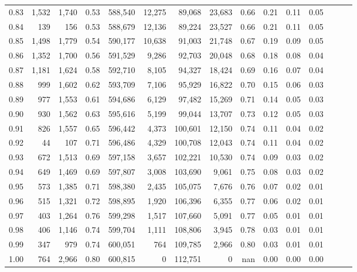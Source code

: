 \begin{tabular}{rrrrrrrrrrrrrrr}
0.83 &   1,532 &  1,740 &  0.53 &  588,540 &   12,275 &   89,068 &   23,683 &  0.66 &  0.21 &  0.11 &      0.05 \\
0.84 &     139 &    156 &  0.53 &  588,679 &   12,136 &   89,224 &   23,527 &  0.66 &  0.21 &  0.11 &      0.05 \\
0.85 &   1,498 &  1,779 &  0.54 &  590,177 &   10,638 &   91,003 &   21,748 &  0.67 &  0.19 &  0.09 &      0.05 \\
0.86 &   1,352 &  1,700 &  0.56 &  591,529 &    9,286 &   92,703 &   20,048 &  0.68 &  0.18 &  0.08 &      0.04 \\
0.87 &   1,181 &  1,624 &  0.58 &  592,710 &    8,105 &   94,327 &   18,424 &  0.69 &  0.16 &  0.07 &      0.04 \\
0.88 &     999 &  1,602 &  0.62 &  593,709 &    7,106 &   95,929 &   16,822 &  0.70 &  0.15 &  0.06 &      0.03 \\
0.89 &     977 &  1,553 &  0.61 &  594,686 &    6,129 &   97,482 &   15,269 &  0.71 &  0.14 &  0.05 &      0.03 \\
0.90 &     930 &  1,562 &  0.63 &  595,616 &    5,199 &   99,044 &   13,707 &  0.73 &  0.12 &  0.05 &      0.03 \\
0.91 &     826 &  1,557 &  0.65 &  596,442 &    4,373 &  100,601 &   12,150 &  0.74 &  0.11 &  0.04 &      0.02 \\
0.92 &      44 &    107 &  0.71 &  596,486 &    4,329 &  100,708 &   12,043 &  0.74 &  0.11 &  0.04 &      0.02 \\
0.93 &     672 &  1,513 &  0.69 &  597,158 &    3,657 &  102,221 &   10,530 &  0.74 &  0.09 &  0.03 &      0.02 \\
0.94 &     649 &  1,469 &  0.69 &  597,807 &    3,008 &  103,690 &    9,061 &  0.75 &  0.08 &  0.03 &      0.02 \\
0.95 &     573 &  1,385 &  0.71 &  598,380 &    2,435 &  105,075 &    7,676 &  0.76 &  0.07 &  0.02 &      0.01 \\
0.96 &     515 &  1,321 &  0.72 &  598,895 &    1,920 &  106,396 &    6,355 &  0.77 &  0.06 &  0.02 &      0.01 \\
0.97 &     403 &  1,264 &  0.76 &  599,298 &    1,517 &  107,660 &    5,091 &  0.77 &  0.05 &  0.01 &      0.01 \\
0.98 &     406 &  1,146 &  0.74 &  599,704 &    1,111 &  108,806 &    3,945 &  0.78 &  0.03 &  0.01 &      0.01 \\
0.99 &     347 &    979 &  0.74 &  600,051 &      764 &  109,785 &    2,966 &  0.80 &  0.03 &  0.01 &      0.01 \\
1.00 &     764 &  2,966 &  0.80 &  600,815 &        0 &  112,751 &        0 &   nan &  0.00 &  0.00 &      0.00 \\
\bottomrule
\end{tabular}
